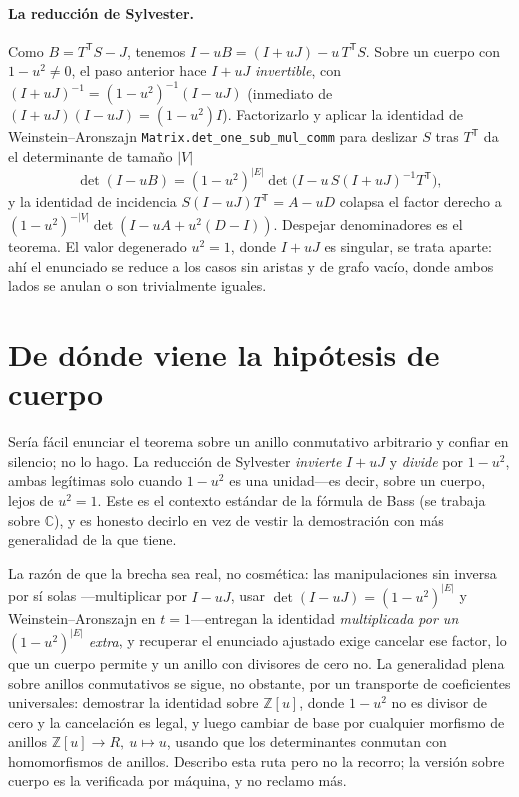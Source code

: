 \documentclass[11pt]{article}
\newcommand{\lean}[1]{\texttt{#1}}
\newcommand{\Z}{\mathbb{Z}}
\begin{document}
\paragraph{La reducci\'on de Sylvester.}
Como $B=T^{\mathsf T}S-J$, tenemos $I-uB=(I+uJ)-u\,T^{\mathsf T}S$. Sobre un cuerpo con $1-u^2\neq0$,
el paso anterior hace $I+uJ$ \emph{invertible}, con $(I+uJ)^{-1}=(1-u^2)^{-1}(I-uJ)$ (inmediato de
$(I+uJ)(I-uJ)=(1-u^2)I$). Factorizarlo y aplicar la identidad de Weinstein--Aronszajn
\lean{Matrix.det\_one\_sub\_mul\_comm} para deslizar $S$ tras $T^{\mathsf T}$ da el determinante de
tama\~no $|V|$
\[
  \det(I-uB)=(1-u^2)^{|E|}\det\!\bigl(I-u\,S(I+uJ)^{-1}T^{\mathsf T}\bigr),
\]
y la identidad de incidencia $S(I-uJ)T^{\mathsf T}=A-uD$ colapsa el factor derecho a
$(1-u^2)^{-|V|}\det(I-uA+u^2(D-I))$. Despejar denominadores es el teorema. El valor degenerado
$u^2=1$, donde $I+uJ$ es singular, se trata aparte: ah\'i el enunciado se reduce a los casos sin
aristas y de grafo vac\'io, donde ambos lados se anulan o son trivialmente iguales.

\section{De d\'onde viene la hip\'otesis de cuerpo}
\label{sec:field}

Ser\'ia f\'acil enunciar el teorema sobre un anillo conmutativo arbitrario y confiar en silencio; no
lo hago. La reducci\'on de Sylvester \emph{invierte} $I+uJ$ y \emph{divide} por $1-u^2$, ambas
leg\'itimas solo cuando $1-u^2$ es una unidad---es decir, sobre un cuerpo, lejos de $u^2=1$. Este es
el contexto est\'andar de la f\'ormula de Bass (se trabaja sobre $\mathbb{C}$), y es honesto decirlo
en vez de vestir la demostraci\'on con m\'as generalidad de la que tiene.

La raz\'on de que la brecha sea real, no cosm\'etica: las manipulaciones sin inversa por s\'i solas
---multiplicar por $I-uJ$, usar $\det(I-uJ)=(1-u^2)^{|E|}$ y Weinstein--Aronszajn en $t=1$---entregan
la identidad \emph{multiplicada por un $(1-u^2)^{|E|}$ extra}, y recuperar el enunciado ajustado
exige cancelar ese factor, lo que un cuerpo permite y un anillo con divisores de cero no. La
generalidad plena sobre anillos conmutativos se sigue, no obstante, por un transporte de
coeficientes universales: demostrar la identidad sobre $\Z[u]$, donde $1-u^2$ no es divisor de cero y
la cancelaci\'on es legal, y luego cambiar de base por cualquier morfismo de anillos $\Z[u]\to R,\
u\mapsto u$, usando que los determinantes conmutan con homomorfismos de anillos. Describo esta ruta
pero no la recorro; la versi\'on sobre cuerpo es la verificada por m\'aquina, y no reclamo m\'as.
\end{document}
